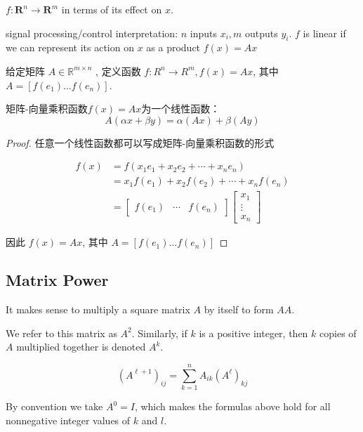 $ f: \mathbf{R}^{n} \rightarrow \mathbf{R}^{m} $ in terms of its effect on $ x $. 

signal processing/control interpretation: $ n $ inputs $ x_{i}, m $ outputs $ y_{i} $. $ f $ is linear if we can represent its action on $ x $ as a product $ f(x)=A x $

\begin{definition}[矩阵-向量乘积函数 $f(x)=A x$]
    给定矩阵 $ A \in \mathbb{R}^{m \times n} $ , 定义函数 $ f: R^{n} \rightarrow R^{m}, f(x)=A x $, 其中 $ A=\left[f\left(e_{1}\right) \ldots f\left(e_{n}\right)\right] $.
    
\end{definition}

\begin{theorem}
    矩阵-向量乘积函数$f(x)=A x$为一个线性函数： $$ A(\alpha x+\beta y)=\alpha(A x)+\beta(A y) $$
\end{theorem}

\begin{proof}
    
    
    任意一个线性函数都可以写成矩阵-向量乘积函数的形式

    $$ \begin{aligned} f(x) &=f\left(x_{1} e_{1}+x_{2} e_{2}+\cdots+x_{n} e_{n}\right) \\ &=x_{1} f\left(e_{1}\right)+x_{2} f\left(e_{2}\right)+\cdots+x_{n} f\left(e_{n}\right) \\ &=\left[\begin{array}{lll}f\left(e_{1}\right) & \cdots & f\left(e_{n}\right)\end{array}\right]\left[\begin{array}{c}x_{1} \\ \vdots \\ x_{n}\end{array}\right] \end{aligned} $$

    因此 $ f(x)=A x $, 其中 $ A=\left[f\left(e_{1}\right) \ldots f\left(e_{n}\right)\right] $
\end{proof}

\subsection{Matrix Power}
It makes sense to multiply a square matrix $ A $ by itself to form $ A A $. 
\begin{definition}
    We refer to this matrix as $ A^{2} $. Similarly, if $ k $ is a positive integer, then $ k $ copies of $ A $ multiplied together is denoted $ A^{k} $. 
    
    $$ \left(A^{\ell+1}\right)_{i j}=\sum_{k=1}^{n} A_{i k}\left(A^{\ell}\right)_{k j} $$

    By convention we take $ A^{0}=I $, which makes the
    formulas above hold for all nonnegative integer values of $k$ and $l$.
\end{definition}

